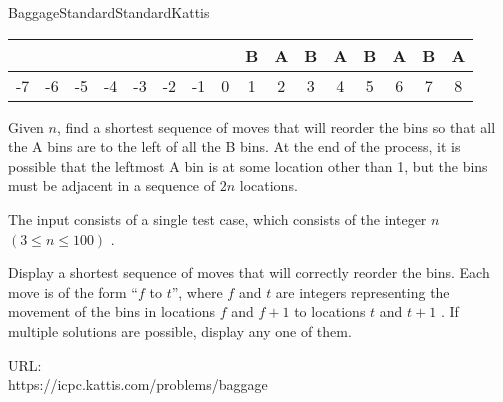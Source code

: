 \begin{problema}{Baggage}{Standard}{Standard}{Kattis}
\begin{center}
\begin{tabular}{c c c c c c c c c c c c c c c c } 
	\hline
	\multicolumn{1}{|c}{ } &
	\multicolumn{1}{|c}{ } &
	\multicolumn{1}{|c}{ } & 
	\multicolumn{1}{|c}{ } &
	\multicolumn{1}{|c}{ } &
	\multicolumn{1}{|c}{ } &
	\multicolumn{1}{|c}{ } &
	\multicolumn{1}{|c}{ } &
	\multicolumn{1}{|c}{B} & 
	\multicolumn{1}{|c}{A} &
	\multicolumn{1}{|c}{B} & 
	\multicolumn{1}{|c}{A} &
	\multicolumn{1}{|c}{B} &
	\multicolumn{1}{|c}{A} & 
	\multicolumn{1}{|c}{B} &
	\multicolumn{1}{|c|}{A} \\  \hline		
	\multicolumn{1}{c}{-7} &
	\multicolumn{1}{c}{-6} &
	\multicolumn{1}{c}{-5} & 
	\multicolumn{1}{c}{-4} &
	\multicolumn{1}{c}{-3} &
	\multicolumn{1}{c}{-2} &
	\multicolumn{1}{c}{-1} &
	\multicolumn{1}{c}{0} &
	\multicolumn{1}{c}{1} & 
	\multicolumn{1}{c}{2} &
	\multicolumn{1}{c}{3} & 
	\multicolumn{1}{c}{4} &
	\multicolumn{1}{c}{5} &
	\multicolumn{1}{c}{6} & 
	\multicolumn{1}{c}{7} &
	\multicolumn{1}{c}{8} \\	 
	
\end{tabular}
\end{center}

Given $n$, find a shortest sequence of moves that will reorder the bins so that all the A bins are to the left of all the B bins. At the end of the process, it is possible that the leftmost A bin is at some location other than 1, but the bins must be adjacent in a sequence of $2n$  locations.


\InputFile

The input consists of a single test case, which consists of the integer $n$  $(3 \leq n \leq 100)$ .
 \\


\OutputFile

Display a shortest sequence of moves that will correctly reorder the bins. Each move is of the form ``$f$  to $t$'', where $f$  and $t$  are integers representing the movement of the bins in locations $f$  and $f+1$  to locations $t$  and $t+1$ . If multiple solutions are possible, display any one of them.  \\


\Example




URL: \\
https://icpc.kattis.com/problems/baggage

\end{problema}
